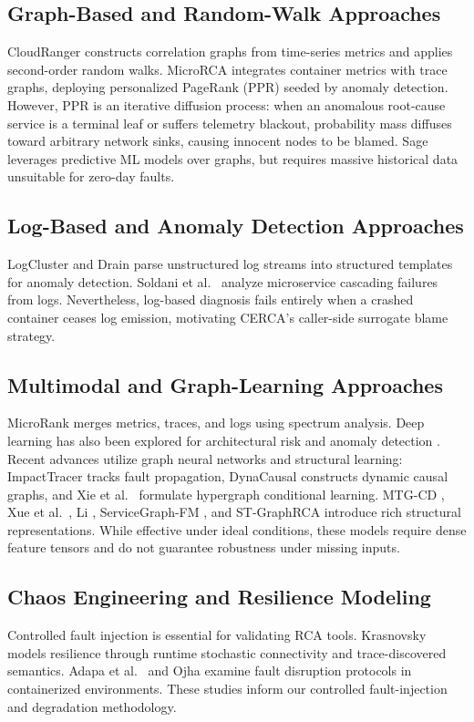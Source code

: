 \documentclass[conference]{IEEEtran}
\begin{document}
\subsection{Graph-Based and Random-Walk Approaches}
CloudRanger \cite{wang2018} constructs correlation graphs from time-series metrics and applies second-order random walks. MicroRCA \cite{wu2020} integrates container metrics with trace graphs, deploying personalized PageRank (PPR) seeded by anomaly detection. However, PPR is an iterative diffusion process: when an anomalous root-cause service is a terminal leaf or suffers telemetry blackout, probability mass diffuses toward arbitrary network sinks, causing innocent nodes to be blamed. Sage \cite{bhagwan2020} leverages predictive ML models over graphs, but requires massive historical data unsuitable for zero-day faults.

\subsection{Log-Based and Anomaly Detection Approaches}
LogCluster \cite{vaarandi2015} and Drain \cite{he2017} parse unstructured log streams into structured templates for anomaly detection. Soldani et al.\ \cite{soldani2024} analyze microservice cascading failures from logs. Nevertheless, log-based diagnosis fails entirely when a crashed container ceases log emission, motivating CERCA's caller-side surrogate blame strategy.

\subsection{Multimodal and Graph-Learning Approaches}
MicroRank \cite{yu2021} merges metrics, traces, and logs using spectrum analysis. Deep learning has also been explored for architectural risk and anomaly detection \cite{abdulsatar2025,wu2026dl}. Recent advances utilize graph neural networks and structural learning: ImpactTracer \cite{xie2023impact} tracks fault propagation, DynaCausal \cite{zhang2025dyna} constructs dynamic causal graphs, and Xie et al.\ \cite{xie2025hyper} formulate hypergraph conditional learning. MTG-CD \cite{chen2024mtgcd}, Xue et al.\ \cite{xue2026}, Li \cite{li2026}, ServiceGraph-FM \cite{zeng2026}, and ST-GraphRCA \cite{su2026} introduce rich structural representations. While effective under ideal conditions, these models require dense feature tensors and do not guarantee robustness under missing inputs.

\subsection{Chaos Engineering and Resilience Modeling}
Controlled fault injection is essential for validating RCA tools. Krasnovsky \cite{krasnovsky2026model,krasnovsky2026stoch,krasnovsky2025async} models resilience through runtime stochastic connectivity and trace-discovered semantics. Adapa et al.\ \cite{adapa2025} and Ojha \cite{ojha2022} examine fault disruption protocols in containerized environments. These studies inform our controlled fault-injection and degradation methodology.
\end{document}
